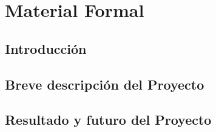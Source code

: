 \chapter{Material Formal}

\section{Introducci\'on} %

\section{Breve descripci\'on del Proyecto} %

\section{Resultado y futuro del Proyecto} %
